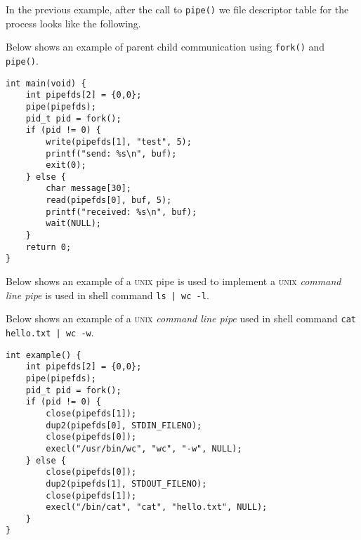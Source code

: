 \frmrule

In the previous example, after the call to \lstinline{pipe()} 
we file descriptor table for the process looks like the following.


\frmrule


\begin{example}
Below shows an example of parent child communication 
using \lstinline{fork()} and \lstinline{pipe()}.


\begin{lstlisting}
int main(void) {
    int pipefds[2] = {0,0};
    pipe(pipefds);
    pid_t pid = fork();
    if (pid != 0) { 
        write(pipefds[1], "test", 5);
        printf("send: %s\n", buf);
        exit(0);
    } else { 
        char message[30];
        read(pipefds[0], buf, 5);
        printf("received: %s\n", buf);
        wait(NULL);
    }
    return 0;
}
\end{lstlisting}
\end{example}






\frmrule

\begin{example}
Below shows an example of a \textsc{unix} pipe is used to 
implement a \textsc{unix} \textit{command line pipe}  is used 
in shell command \lstinline{ls | wc -l}.

\begin{figure}[h]
\end{figure} 
\end{example}



\frmrule

\begin{example}
Below shows an example of a \textsc{unix} \textit{command line pipe} 
used in shell command \lstinline{cat hello.txt | wc -w}.

\begin{lstlisting}
int example() {
    int pipefds[2] = {0,0};
    pipe(pipefds);
    pid_t pid = fork();
    if (pid != 0) { 
        close(pipefds[1]);
        dup2(pipefds[0], STDIN_FILENO);
        close(pipefds[0]);
        execl("/usr/bin/wc", "wc", "-w", NULL);
    } else { 
        close(pipefds[0]);
        dup2(pipefds[1], STDOUT_FILENO);
        close(pipefds[1]);
        execl("/bin/cat", "cat", "hello.txt", NULL);
    }
}
\end{lstlisting}
\end{example}



